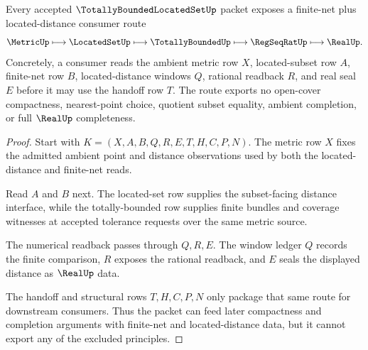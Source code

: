 \begin{theorem}
\label{thm:totally-bounded-located-set-net-distance-handoff}
Every accepted $\TotallyBoundedLocatedSetUp$ packet exposes a finite-net plus located-distance consumer route
$$
\MetricUp
\longmapsto
\LocatedSetUp
\longmapsto
\TotallyBoundedUp
\longmapsto
\RegSeqRatUp
\longmapsto
\RealUp .
$$
Concretely, a consumer reads the ambient metric row $X$, located-subset row $A$, finite-net row $B$, located-distance windows $Q$, rational readback $R$, and real seal $E$ before it may use the handoff row $T$. The route exports no open-cover compactness, nearest-point choice, quotient subset equality, ambient completion, or full $\RealUp$ completeness.
\end{theorem}
\begin{proof}
Start with $K=(X,A,B,Q,R,E,T,H,C,P,N)$. The metric row $X$ fixes the admitted ambient point and distance observations used by both the located-distance and finite-net reads.

Read $A$ and $B$ next. The located-set row supplies the subset-facing distance interface, while the totally-bounded row supplies finite bundles and coverage witnesses at accepted tolerance requests over the same metric source.

The numerical readback passes through $Q,R,E$. The window ledger $Q$ records the finite comparison, $R$ exposes the rational readback, and $E$ seals the displayed distance as $\RealUp$ data.

The handoff and structural rows $T,H,C,P,N$ only package that same route for downstream consumers. Thus the packet can feed later compactness and completion arguments with finite-net and located-distance data, but it cannot export any of the excluded principles.
\end{proof}


\begin{closurestatus}{\TotallyBoundedLocatedSetUp}
  \theoryclosure{\seedClosure}
  \formalstatus{\unformalizedV}
\end{closurestatus}
